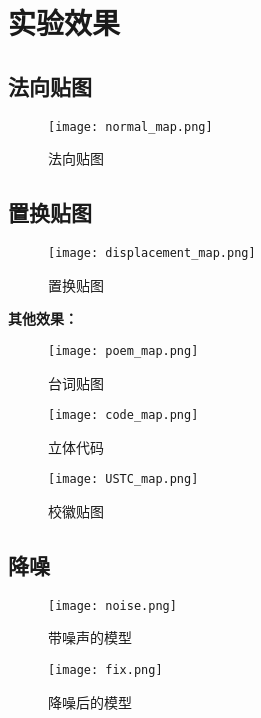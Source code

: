 \documentclass[14pt]{scrartcl} %
\begin{document}
\pagebreak

\section{实验效果}
\subsection{法向贴图}
\begin{figure}[h] %
	\centering
	\texttt{[image: normal\_map.png]} %
	\caption{法向贴图}
\end{figure}

\pagebreak
\subsection{置换贴图}
\begin{figure}[h] %
	\centering
	\texttt{[image: displacement\_map.png]} %
	\caption{置换贴图}
\end{figure}

\textbf{其他效果：}
\begin{figure}[h] %
	\centering
	\texttt{[image: poem\_map.png]} %
	\caption{台词贴图}
\end{figure}
\pagebreak
\begin{figure}[htbp] %
	\centering
	\texttt{[image: code\_map.png]} %
	\caption{立体代码}
		\centering
	\texttt{[image: USTC\_map.png]} %
	\caption{校徽贴图}
\end{figure}



\pagebreak
\subsection{降噪}
\begin{figure}[htbp] %
	\centering
	\texttt{[image: noise.png]} %
	\caption{带噪声的模型}
	
		\centering
	\texttt{[image: fix.png]} %
	\caption{降噪后的模型}
\end{figure}


\pagebreak
\end{document}
